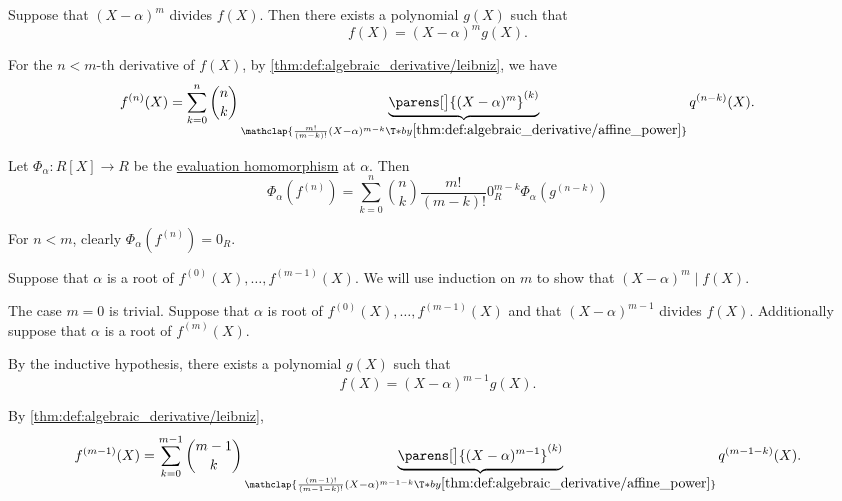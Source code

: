 \begin{defproof}
   Suppose that \( (X - \alpha)^m \) divides \( f(X) \). Then there exists a polynomial \( g(X) \) such that
  \begin{equation*}
    f(X) = (X - \alpha)^m g(X).
  \end{equation*}

  For the \( n < m \)-th derivative of \( f(X) \), by \cref{thm:def:algebraic_derivative/leibniz}, we have
  \begin{equation*}
    f^{(n)}(X) = \sum_{k=0}^n \binom n k \underbrace{\parens[\big]{ (X - \alpha)^m }^{(k)}}_{\mathclap{\frac {m!} {(m-k)!} (X - \alpha)^{m-k} \T*{by} \ref{thm:def:algebraic_derivative/affine_power}}} q^{(n-k)}(X).
  \end{equation*}

  Let \( \Phi_\alpha: R[X] \to R \) be the \hyperref[con:free_construction/evaluation]{evaluation homomorphism} at \( \alpha \). Then
  \begin{equation*}
    \Phi_\alpha(f^{(n)}) = \sum_{k=0}^n \binom n k \frac {m!} {(m-k)!} 0_R^{m-k} \Phi_\alpha(g^{(n-k)})
  \end{equation*}

  For \( n < m \), clearly \( \Phi_\alpha(f^{(n)}) = 0_R \).

   Suppose that \( \alpha \) is a root of \( f^{(0)}(X), \ldots, f^{(m-1)}(X) \). We will use induction on \( m \) to show that \( (X - \alpha)^m \mid f(X) \).

  The case \( m = 0 \) is trivial. Suppose that \( \alpha \) is root of \( f^{(0)}(X), \ldots, f^{(m-1)}(X) \) and that \( (X - \alpha)^{m-1} \) divides \( f(X) \). Additionally suppose that \( \alpha \) is a root of \( f^{(m)}(X) \).

  By the inductive hypothesis, there exists a polynomial \( g(X) \) such that
  \begin{equation*}
    f(X) = (X - \alpha)^{m-1} g(X).
  \end{equation*}

  By \cref{thm:def:algebraic_derivative/leibniz},
  \begin{equation*}
    f^{(m-1)}(X) = \sum_{k=0}^{m-1} \binom {m-1} k \underbrace{\parens[\big]{ (X - \alpha)^{m - 1} }^{(k)}}_{\mathclap{\frac {(m - 1)!} {(m - 1 - k)!} (X - \alpha)^{m - 1 - k} \T*{by} \ref{thm:def:algebraic_derivative/affine_power}}} q^{(m - 1 - k)}(X).
  \end{equation*}


\end{defproof}
